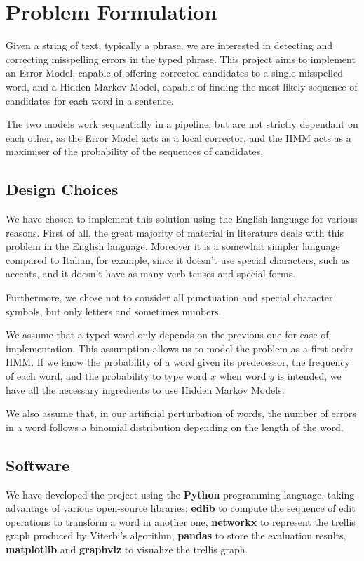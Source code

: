 \chapter{Problem Formulation}

Given a string of text, typically a phrase, we are interested in detecting and correcting misspelling errors in the 
typed phrase. This project aims to implement an Error Model, capable of offering corrected candidates to a single 
misspelled word, and a Hidden Markov Model, capable of finding the most likely sequence of candidates for each word in 
a sentence.

The two models work sequentially in a pipeline, but are not strictly dependant on each other, as the Error Model 
acts as a local corrector, and the HMM acts as a maximiser of the probability of the sequences of candidates.

\section{Design Choices}

We have chosen to implement this solution using the English language for various reasons. First of all, the great 
majority of material in literature deals with this problem in the English language. Moreover it is a somewhat simpler 
language compared to Italian, for example, since it doesn't use special characters, such as accents, and it doesn't 
have as many verb tenses and special forms.

Furthermore, we chose not to consider all punctuation and special character symbols, but only letters and sometimes 
numbers. 

We assume that a typed word only depends on the previous one for ease of implementation. This assumption allows us to 
model the problem as a first order HMM. 
If we know the probability of a word given its predecessor, the frequency of each word, and the probability to 
type word $x$ when word $y$ is intended, we have all the necessary ingredients to use Hidden Markov Models.

We also assume that, in our artificial perturbation of words, the number of errors in a word follows a binomial 
distribution depending on the length of the word.

\section{Software}
We have developed the project using the \textbf{Python} programming language, taking advantage of various open-source 
libraries: \textbf{edlib} to compute the sequence of edit operations to transform a word in another one,  
\textbf{networkx} to represent the trellis graph produced by Viterbi's algorithm, \textbf{pandas} to store the 
evaluation results, \textbf{matplotlib} and \textbf{graphviz} to visualize the trellis graph.

